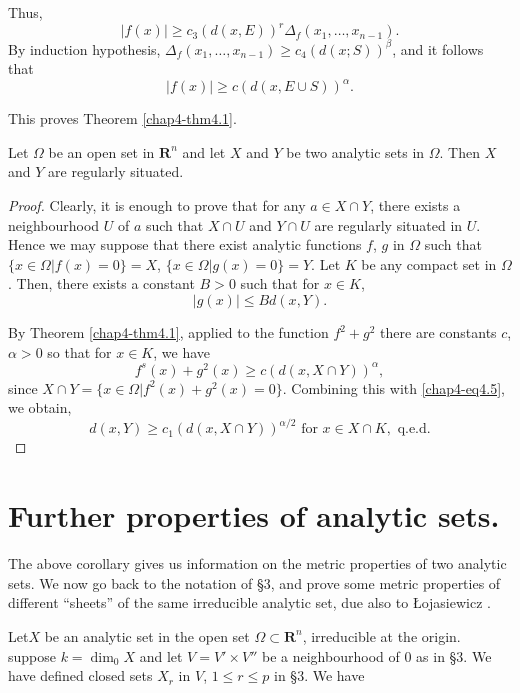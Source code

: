 Thus,
$$
|f(x)| \geq c_3 (d (x, E))^r \Delta_f (x_1, \ldots, x_{n-1}).
$$
By induction hypothesis, $\Delta_f (x_1, \ldots, x_{n-1}) \geq c_4 (d (x; S))^\beta$, and it follows that
$$
|f(x)| \geq c (d (x, E \cup S))^\alpha. 
$$

This proves Theorem \ref{chap4-thm4.1}.

\setcounter{theorem}{3}
\begin{corollary}\label{chap4-coro4.4}
Let $\Omega$ be an open set in $\mathbf{R}^n$ and let $X$ and $Y$ be two analytic sets in $\Omega$. Then $X$ and $Y$ are regularly situated. 
\end{corollary}

\begin{proof}
  Clearly, it is enough to prove that for any $a \in X \cap Y$, there exists a neighbourhood $U$ of $a$ such that $X \cap U$ and $Y \cap U$ are regularly situated in $U$. Hence we may suppose that there exist analytic functions $f$, $g$ in $\Omega$ such that $\{x \in \Omega | f (x) = 0 \} = X$, $\{x \in \Omega | g (x) =0 \} = Y$. Let $K$  be any compact set in $\Omega$. Then, there exists a constant $B >0 $ such that for $x \in K$,
 \setcounter{equation}{4}
  \begin{equation}
    |g(x)| \leq B d (x, Y). \label{chap4-eq4.5}
  \end{equation}

  By Theorem \ref{chap4-thm4.1}, applied to the function $f^2 + g^2$ there are constants $c$, $\alpha > 0$ so that for $x \in K$, we have
  $$
f^s (x) + g^2 (x) \geq c (d (x, X \cap Y))^\alpha,
$$
since $X \cap Y = \{x \in \Omega| f^2 (x) + g^2 (x) = 0\}$. Combining this with \eqref{chap4-eq4.5}, we obtain,
$$
d (x, Y) \geq c_1 (d (x, X \cap Y))^{\alpha/2} \text{ for  } x \in X \cap K , \text{ q.e.d.}
$$
\end{proof}

\section{Further properties of analytic sets.}\label{chap4-sec5}%

The above corollary gives us information on the metric properties of two analytic sets. We now go back to the notation of \S 3, and prove some metric properties of different ``sheets'' of the same irreducible analytic set, due also to {\L}ojasiewicz \cite{S. Lojasiewicz : 1}.

Let\pageoriginale $X$ be an analytic set in the open set $\Omega \subset \mathbf{R}^n$, irreducible at the origin. suppose $k = \dim_0 X$ and let $V = V' \times V''$ be a neighbourhood of 0 as in \S 3. We have defined closed sets $X_r$ in $V$, $1 \leq r \leq p$ in \S 3. We have

